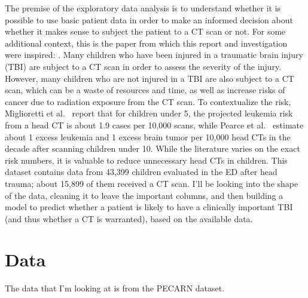 \documentclass[10pt,letterpaper]{article}
\begin{document}
The premise of the exploratory data analysis is to understand whether it is possible to use basic patient data in order to make an informed decision about whether it makes sense to subject the patient to a CT scan or not. 
For some additional context, this is the paper from which this report and investigation were inspired: \cite{kuppermann2009}. 
Many children who have been injured in a traumatic brain injury (TBI) are subject to a CT scan in order to assess the severity of the injury.
However, many children who are not injured in a TBI are also subject to a CT scan, which can be a waste of resources and time, as well as increase risks of cancer due to radiation exposure from the CT scan.
To contextualize the risk, Miglioretti et al.~\cite{miglioretti2013} report that for children under 5, the projected leukemia risk from a head CT is about 1.9 cases per 10{,}000 scans, while Pearce et al.~\cite{pearce2012} estimate about 1 excess leukemia and 1 excess brain tumor per 10{,}000 head CTs in the decade after scanning children under 10.
While the literature varies on the exact risk numbers, it is valuable to reduce unnecessary head CTs in children.
This dataset contains data from 43,399 children evaluated in the ED after head trauma; about 15,899 of them received a CT scan. I'll be looking into the shape of the data, cleaning it to leave the important columns, and then building a model to predict whether a patient is likely to have a clinically important TBI (and thus whether a CT is warranted), based on the available data.


\section{Data}\label{data}
The data that I'm looking at is from the PECARN dataset. 
\end{document}
